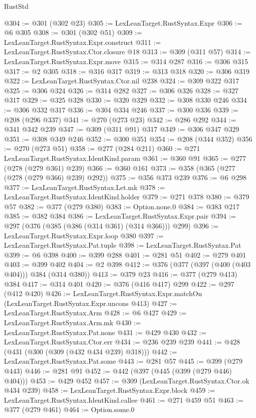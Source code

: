 \begin{lexlean}{RustStd}
\begin{coremodule}
{\begin{coremodule}
{{{{{{{{{{@304 := @301 (@302 @23)
@305 := LexLeanTarget.RustSyntax.Expr
@306 := @6 @305
@308 := @301 (@302 @51)
@309 := LexLeanTarget.RustSyntax.Expr.construct
@311 := LexLeanTarget.RustSyntax.Ctor.closure @18
@313 := @309 (@311 @57)
@314 := LexLeanTarget.RustSyntax.Expr.move
@315 := @314 @287
@316 := @306 @315
@317 := @2 @305
@318 := @316 @317
@319 := @313 @318
@320 := @306 @319
@322 := LexLeanTarget.RustSyntax.Ctor.nil @238
@324 := @309 @322 @317
@325 := @306 @324
@326 := @314 @282
@327 := @306 @326
@328 := @327 @317
@329 := @325 @328
@330 := @320 @329
@332 := @308 @330 @246
@334 := @306 @332 @317
@336 := @304 @334 @246
@337 := @300 @336
@339 := @208 (@296 @337)
@341 := @270 (@273 @23)
@342 := @286 @292
@344 := @341 @342 @239
@347 := @309 (@311 @91) @317
@349 := @306 @347 @329
@351 := @308 @349 @246
@352 := @300 @351
@354 := @208 (@344 @352)
@356 := @270 (@273 @51)
@358 := @277 (@284 @211)
@360 := @271 LexLeanTarget.RustSyntax.IdentKind.param
@361 := @360 @91
@365 := @277 (@278 (@279 @361) @239)
@366 := @360 @161
@373 := @358 (@365 (@277 (@278 (@279 @366) @239) @292))
@375 := @356 @373 @239
@376 := @6 @298
@377 := LexLeanTarget.RustSyntax.Let.mk
@378 := LexLeanTarget.RustSyntax.IdentKind.holder
@379 := @271 @378
@380 := @379 @57
@382 := @377 (@279 @380)
@383 := Option.none.{0}
@384 := @383 @217
@385 := @382 @384
@386 := LexLeanTarget.RustSyntax.Expr.pair
@394 := @297 (@376 (@385 (@386 (@314 @361) (@314 @366))) @299)
@396 := LexLeanTarget.RustSyntax.Expr.loop @380
@397 := LexLeanTarget.RustSyntax.Pat.tuple
@398 := LexLeanTarget.RustSyntax.Pat
@399 := @6 @398
@400 := @399 @288
@401 := @281 @51
@402 := @279 @401
@403 := @399 @402
@404 := @2 @398
@412 := @376 (@377 (@397 (@400 (@403 @404))) @384 (@314 @380))
@413 := @379 @23
@416 := @377 (@279 @413) @384
@417 := @314 @401
@420 := @376 (@416 @417) @299
@422 := @297 (@412 @420)
@426 := LexLeanTarget.RustSyntax.Expr.matchOn (LexLeanTarget.RustSyntax.Expr.uncons @413)
@427 := LexLeanTarget.RustSyntax.Arm
@428 := @6 @427
@429 := LexLeanTarget.RustSyntax.Arm.mk
@430 := LexLeanTarget.RustSyntax.Pat.none
@431 := @429 @430
@432 := LexLeanTarget.RustSyntax.Ctor.err
@434 := @236 @239 @239
@441 := @428 (@431 (@300 (@309 (@432 @434 @239) @318)))
@442 := LexLeanTarget.RustSyntax.Pat.some
@443 := @281 @57
@445 := @399 (@279 @443)
@446 := @281 @91
@452 := @442 (@397 (@445 (@399 (@279 @446) @404)))
@453 := @429 @452
@457 := @309 (LexLeanTarget.RustSyntax.Ctor.ok @434 @239)
@458 := LexLeanTarget.RustSyntax.Expr.block
@459 := LexLeanTarget.RustSyntax.IdentKind.callee
@461 := @271 @459 @51
@463 := @377 (@279 @461)
@464 := Option.some.{0}
}}}}}}}}}}
\end{coremodule}}
\end{coremodule}
\end{lexlean}

